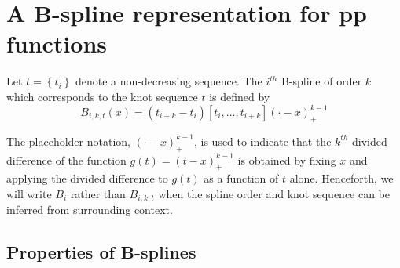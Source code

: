 \documentclass[12pt]{article}
\newenvironment{definition}[1][Definition]{\begin{trivlist}
\item[\hskip \labelsep {\bfseries #1}]}{\end{trivlist}}
\begin{document}
\section{A B-spline representation for pp functions}

\begin{definition} \label{definition:order_k_Bspline}
Let $t= \left\{ t_i \right\}$ denote a non-decreasing sequence. The $i^{th}$ B-spline of order $k$ which corresponds to the knot sequence $t$ is defined by 
\begin{equation} \label{eq:bspline_definition}
B_{i,k,t}\left(x\right) = \left(t_{i+k}-t_i\right)\left[t_i,\dots,t_{i+k}\right]\left(\cdot -x\right)_+^{k-1}
\end{equation}
\end{definition}

The placeholder notation, $\left(\cdot - x\right)_+^{k-1}$, is used to indicate that the $k^{th}$ divided difference of the function $g\left(t \right) = \left(t-x\right)^{k-1}_+$ is obtained by fixing $x$ and applying the divided difference to $g\left(t \right)$ as a function of $t$ alone. Henceforth, we will write $B_i$ rather than $B_{i,k,t}$ when the spline order and knot sequence can be inferred from surrounding context.

\subsection{Properties of B-splines}
\end{document}
